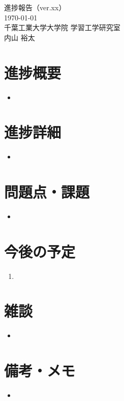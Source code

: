 \documentclass[a4paper,12pt]{ltjsarticle}
\begin{document}
\begin{center}
  {\huge 進捗報告（ver.xx）}\\[1em]
  {\large \today}\\
  {\large 千葉工業大学大学院 学習工学研究室}\\
  {\large 内山 裕太}
\end{center}

\vspace{2em}

\section{進捗概要}
\begin{itemize}
  \item 
\end{itemize}

\section{進捗詳細}
\begin{itemize}
  \item 
\end{itemize}

\section{問題点・課題}
\begin{itemize}
  \item 
\end{itemize}

\section{今後の予定}
\begin{enumerate}
  \item 
\end{enumerate}

\section*{雑談}
\begin{itemize}
  \item 
\end{itemize}

\section*{備考・メモ}
\begin{itemize}
  \item 
\end{itemize}
\end{document}
